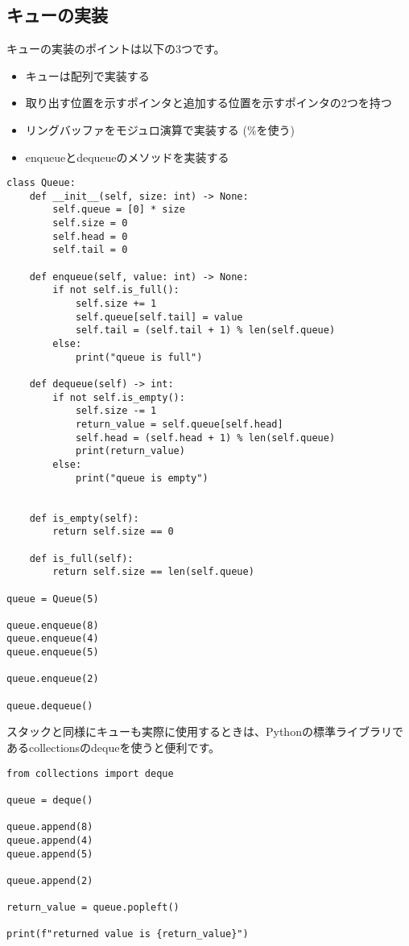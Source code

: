 \documentclass{jlreq}
\begin{document}
\subsection{キューの実装}
キューの実装のポイントは以下の3つです。
\begin{itemize}
	\item キューは配列で実装する
	\item 取り出す位置を示すポインタと追加する位置を示すポインタの2つを持つ
	\item リングバッファをモジュロ演算で実装する (\%を使う)
	\item enqueueとdequeueのメソッドを実装する
\end{itemize}

\begin{lstlisting}[caption=キューの実装, frame=TRBL, label={queue}]
	class Queue:
    def __init__(self, size: int) -> None:
        self.queue = [0] * size
        self.size = 0
        self.head = 0
        self.tail = 0
        
    def enqueue(self, value: int) -> None:
        if not self.is_full():
            self.size += 1
            self.queue[self.tail] = value
            self.tail = (self.tail + 1) % len(self.queue)
        else:
            print("queue is full")
    
    def dequeue(self) -> int:
        if not self.is_empty():
            self.size -= 1
            return_value = self.queue[self.head]
            self.head = (self.head + 1) % len(self.queue)
            print(return_value)
        else:
            print("queue is empty")
        
    
    def is_empty(self):
        return self.size == 0

    def is_full(self):
        return self.size == len(self.queue)

queue = Queue(5)

queue.enqueue(8)
queue.enqueue(4)
queue.enqueue(5)

queue.enqueue(2)

queue.dequeue()

\end{lstlisting}

\begin{tcolorbox}[enhanced, title=Column2 collections.deque, breakable, colback=white, drop fuzzy shadow, attach boxed title to top center={yshift*=0.1cm}]
	スタックと同様にキューも実際に使用するときは、Pythonの標準ライブラリであるcollectionsのdequeを使うと便利です。
	
	\begin{lstlisting}[frame=TRBL]
		from collections import deque

queue = deque()

queue.append(8)
queue.append(4)
queue.append(5)

queue.append(2)

return_value = queue.popleft()

print(f"returned value is {return_value}")
	\end{lstlisting}
\end{tcolorbox}
\end{document}
